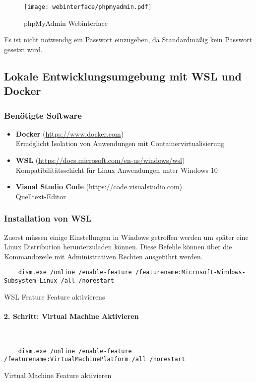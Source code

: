 \begin{figure}[H]
  \centering
  \texttt{[image: webinterface/phpmyadmin.pdf]}
  \caption{phpMyAdmin Webinterface}
\end{figure}

Es ist nicht notwendig ein Passwort einzugeben, da Standardmäßig kein Passwort
gesetzt wird.


\subsection{Lokale Entwicklungsumgebung mit WSL und Docker}


\subsubsection{Benötigte Software}

\begin{itemize}
  \item \textbf{Docker} (\url{https://www.docker.com}) \\ Ermöglicht Isolation
        von Anwendungen mit Containervirtualisierung
  \item \textbf{WSL} (\url{https://docs.microsoft.com/en-us/windows/wsl}) \\
        Kompatibilitätsschicht für Linux Anwendungen unter Windows 10
  \item \textbf{Visual Studio Code} (\url{https://code.visualstudio.com}) \\
        Quelltext-Editor
\end{itemize}


\subsubsection{Installation von WSL}
Zuerst müssen einige Einstellungen in Windows getroffen werden um später eine
Linux Distribution herunterzuladen können. Diese Befehle können über die
Kommandozeile mit Administrativen Rechten ausgeführt werden.

\begin{listing}[H]
  \begin{verbatim}
    dism.exe /online /enable-feature /featurename:Microsoft-Windows-Subsystem-Linux /all /norestart
  \end{verbatim}
  \caption{WSL Feature Feature aktivierens}
\end{listing}

\paragraph{2. Schritt: Virtual Machine Aktivieren}\mbox{}\\
\begin{listing}[H]
  \begin{verbatim}
    dism.exe /online /enable-feature /featurename:VirtualMachinePlatform /all /norestart
  \end{verbatim}
  \caption{Virtual Machine Feature aktivieren}
\end{listing}

